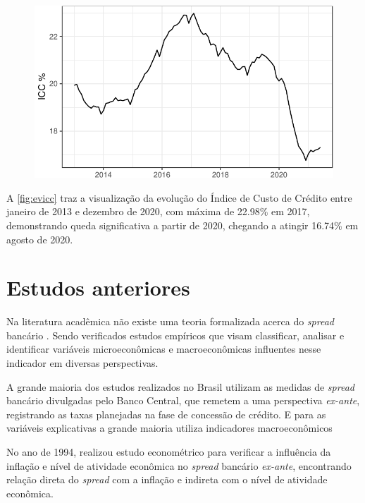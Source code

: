 \documentclass[12pt,12pt,openright,oneside,a4paper,chapter=TITLE,section=TITLE,subsection=TITLE,subsubsection=TITLE,english,french,spanish,portugues,sumario=tradicional]{abntex2}
\begin{document}
\begin{figure}

\begin{center}\includegraphics{12-exportedfigures/ICC-1} \end{center}
\label{fig:evicc}
\end{figure}

A \autoref{fig:evicc} traz a visualização da evolução do Índice de Custo de
Crédito entre janeiro de 2013 e dezembro de 2020, com máxima de 22.98\% em
2017, demonstrando queda significativa a partir de 2020, chegando a atingir 16.74\% em agosto de 2020.

\section{Estudos anteriores}

Na literatura acadêmica não existe uma teoria formalizada acerca do \emph{spread}
bancário \cite{timotio:2018}. Sendo verificados estudos empíricos que visam
classificar, analisar e identificar variáveis microeconômicas e macroeconômicas
influentes nesse indicador em diversas perspectivas.

A grande maioria dos estudos realizados no Brasil utilizam as medidas de
\emph{spread} bancário divulgadas pelo Banco Central, que remetem a uma perspectiva
\emph{ex-ante}, registrando as taxas planejadas na fase de concessão de crédito. E
para as variáveis explicativas a grande maioria utiliza indicadores
macroeconômicos \cite{dantas:2012}

No ano de 1994, \textcite{aronovich:1994} realizou estudo econométrico para
verificar a influência da inflação e nível de atividade econômica no \emph{spread}
bancário \emph{ex-ante}, encontrando relação direta do \emph{spread} com a inflação e
indireta com o nível de atividade econômica.
\end{document}
